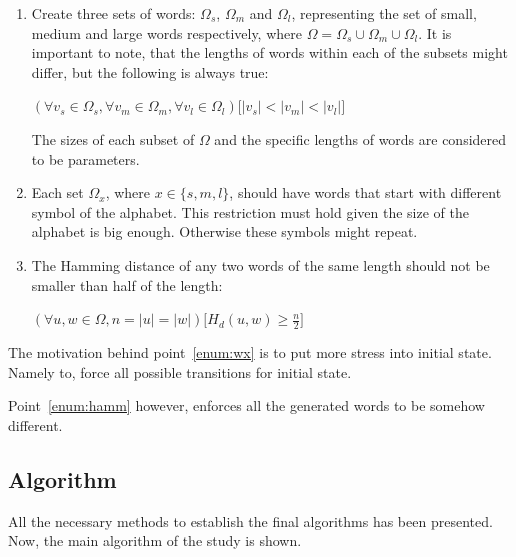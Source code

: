 \documentclass[runningheads, a4paper]{llncs}
\begin{document}
\begin{enumerate}
	\item Create three sets of words: $\Omega_s$, $\Omega_m$ and $\Omega_l$,  representing the set of small, medium and large words respectively, where $\Omega = \Omega_s \cup \Omega_m \cup \Omega_l$. It is important to note, that the lengths of words within each of the subsets might differ, but the following is always true:
\begin{center}
$(\forall {v_{s} \in \Omega_{s}}, \forall {v_{m} \in \Omega_{m}} , \forall{v_{l} \in \Omega_{l}}) \Big[ |v_{s}| < |v_{m}| < |v_{l}| \Big]$
\end{center}

The sizes of each subset of $\Omega$ and the specific lengths of words are considered to be parameters.
	
	\item \label{enum:wx} Each set $\Omega_x$, where $x \in \{s, m, l\}$, should have words that start with different symbol of the alphabet. This restriction must hold given the size of the alphabet is big enough. Otherwise these symbols might repeat.
	
	\item \label{enum:hamm} The Hamming distance of any two words of the same length should not be smaller than half of the length:
	\begin{center}
		$(\forall {u,w \in \Omega}, n=|u| = |w|) \Big[ H_d(u,w) \geq \frac{n}{2} \Big]$
	\end{center}
	
\end{enumerate}

The motivation behind point~\ref{enum:wx} is to put more stress into initial state. Namely to, force all possible transitions for initial state.

Point~\ref{enum:hamm} however, enforces all the generated words to be somehow different.


\subsection{Algorithm}\label{sec:algorithm}
All the necessary methods to establish the final algorithms has been presented. Now, the main algorithm of the study is shown.
\end{document}
